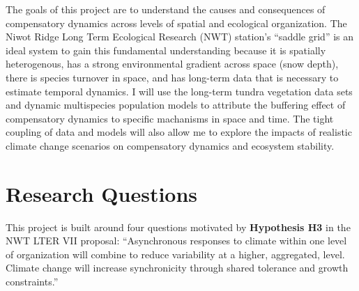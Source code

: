 \documentclass[12pt,]{article}
\begin{document}
The goals of this project are to understand the causes and consequences
of compensatory dynamics across levels of spatial and ecological
organization. The Niwot Ridge Long Term Ecological Research (NWT)
station's ``saddle grid'' is an ideal system to gain this fundamental
understanding because it is spatially heterogenous, has a strong
environmental gradient across space (snow depth), there is species
turnover in space, and has long-term data that is necessary to estimate
temporal dynamics. I will use the long-term tundra vegetation data sets
and dynamic multispecies population models to attribute the buffering
effect of compensatory dynamics to specific machanisms in space and
time. The tight coupling of data and models will also allow me to
explore the impacts of realistic climate change scenarios on
compensatory dynamics and ecosystem stability.

\section{Research Questions}

This project is built around four questions motivated by
\textbf{Hypothesis H3} in the NWT LTER VII proposal: ``Asynchronous
responses to climate within one level of organization will combine to
reduce variability at a higher, aggregated, level. Climate change will
increase synchronicity through shared tolerance and growth
constraints.''
\end{document}
